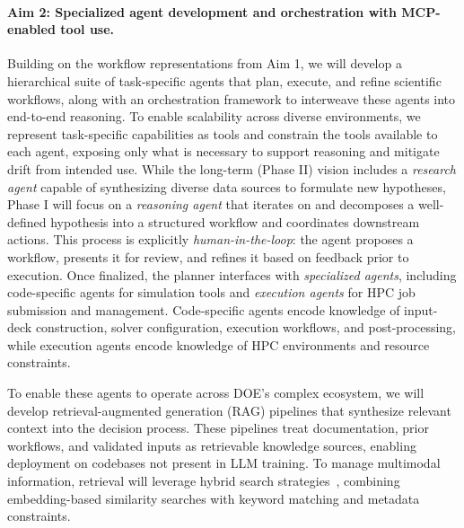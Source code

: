 \documentclass[11pt]{article} \usepackage[margin=1in]{geometry}
\begin{document}
\paragraph{Aim 2: Specialized agent development and orchestration with MCP-enabled tool use.}
Building on the workflow representations from Aim 1, we will develop a hierarchical suite of task-specific agents that plan, execute, and refine scientific workflows, along with an orchestration framework to interweave these agents into end-to-end reasoning. To enable scalability across diverse environments, we represent task-specific capabilities as tools and constrain the tools available to each agent, exposing only what is necessary to support reasoning and mitigate drift from intended use.
While the long-term (Phase II) vision includes a \textit{research agent} capable of synthesizing diverse data sources to formulate new hypotheses, Phase I will focus on a \textit{reasoning agent} that iterates on and decomposes a well-defined hypothesis into a structured workflow and coordinates downstream actions. This process is explicitly \textit{human-in-the-loop}: the agent proposes a workflow, presents it for review, and refines it based on feedback prior to execution. Once finalized, the planner interfaces with \emph{specialized agents}, including code-specific agents for simulation tools and \textit{execution agents} for HPC job submission and management. Code-specific agents encode knowledge of input-deck construction, solver configuration, execution workflows, and post-processing, while execution agents encode knowledge of HPC environments and resource constraints.

To enable these agents to operate across DOE’s complex ecosystem, we will develop retrieval-augmented generation (RAG) pipelines that synthesize relevant context into the decision process. These pipelines treat documentation, prior workflows, and validated inputs as retrievable knowledge sources, enabling deployment on codebases not present in LLM training. To manage multimodal information, retrieval will leverage hybrid search strategies~\cite{edge2025localglobalgraphrag,formal2021spladesparselexicalexpansion,yue2026foamagentautomatedintelligentcfd}, combining embedding-based similarity searches with keyword matching and metadata constraints.
\end{document}

